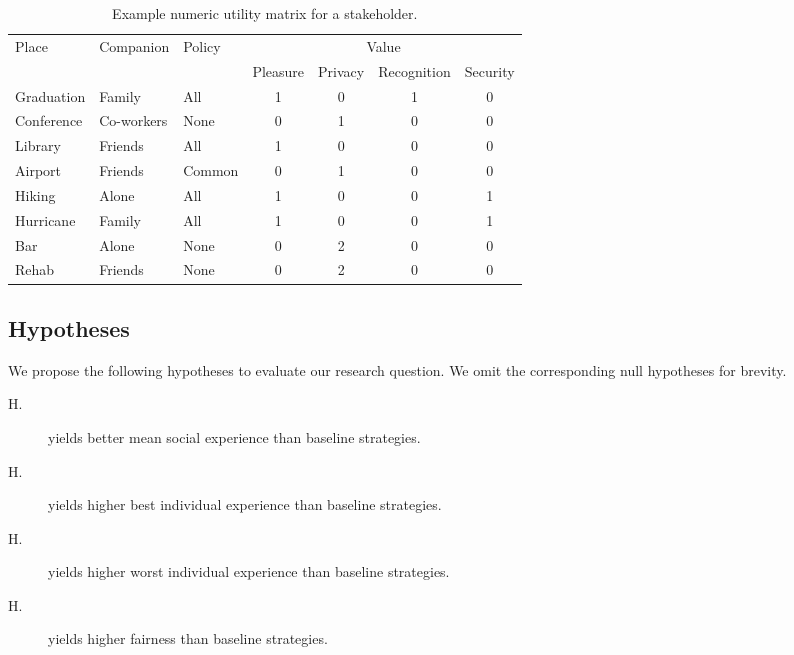 \begin{table}[!htb]
\centering
\caption{Example numeric utility matrix for a stakeholder. }
\label{tab:utlitymatrix}
\begin{tabular}{lllcccc}
\toprule
\multirow{2}{*}{Place} & \multirow{2}{*}{Companion} & \multirow{2}{*}{Policy} & \multicolumn{4}{c}{Value}\\
\cmidrule{4-7}
& & & Pleasure & Privacy & Recognition & Security\\
\midrule
\rowcolor{lightgray!50!}
Graduation & Family & All &1&0&1&0 \\ 
Conference & Co-workers & None &0&1&0&0 \\
\rowcolor{lightgray!50!}
Library & Friends & All &1&0&0&0 \\
Airport & Friends & Common &0&1&0&0 \\
\rowcolor{lightgray!50!}
Hiking & Alone & All &1&0&0&1 \\
Hurricane & Family & All &1&0&0&1 \\
\rowcolor{lightgray!50!}
Bar & Alone & None &0&2&0&0 \\
Rehab & Friends & None &0&2&0&0\\
\bottomrule
\end{tabular}
\end{table}

\subsection{Hypotheses}

We propose the following hypotheses to evaluate our research question. We omit the corresponding null hypotheses for brevity. 

\begin{description}
\item[H.] \frameworkAinur yields better mean social experience than baseline strategies. 
\item[H.] \frameworkAinur yields higher best individual experience than baseline strategies. 
\item[H.] \frameworkAinur yields higher worst individual experience than baseline strategies. 
\item[H.] \frameworkAinur yields higher fairness than baseline strategies. 
\end{description}


